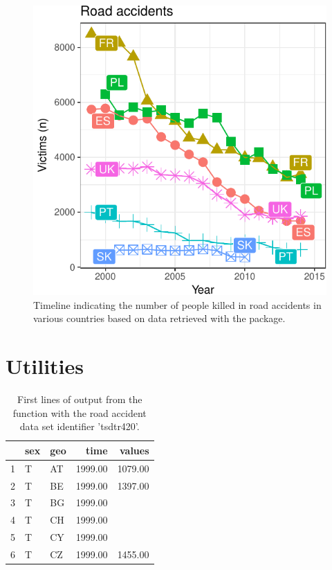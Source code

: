 \begin{figure}
\begin{center}
\includegraphics{2015-manu-roadacc-1}
\end{center}
\caption{Timeline indicating the number of people killed in road accidents in various countries based on data retrieved with the  package.}
\label{fig:transport}
\end{figure}




\section{Utilities}

\begin{table}[ht!]
\centering
\begin{tabular}{rllrr}
\toprule
  \hline
  & sex & geo & time & values \\ 
  \hline
  1 & T & AT & 1999.00 & 1079.00 \\ 
  2 & T & BE & 1999.00 & 1397.00 \\ 
  3 & T & BG & 1999.00 &  \\ 
  4 & T & CH & 1999.00 &  \\ 
  5 & T & CY & 1999.00 &  \\ 
  6 & T & CZ & 1999.00 & 1455.00 \\ 
   \hline
\bottomrule      
\end{tabular}
\caption{First lines of output from the  function with the road accident data set identifier 'tsdtr420'.}
\label{tab:getdatatable}
\end{table}


